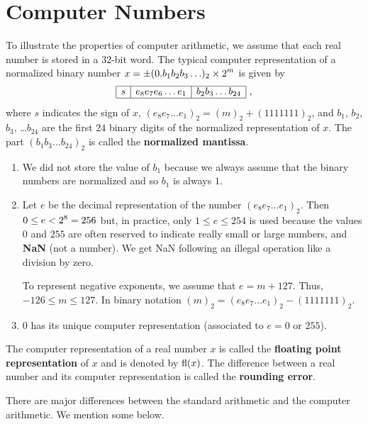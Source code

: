 \section{Computer Numbers}

To illustrate the properties of computer arithmetic, we assume that
each real number is stored in a 32-bit word.  The typical computer
representation of a normalized binary number
$\displaystyle x = \pm(0.b_1 b_2 b_3 \ldots )_2 \times 2^m$ is given by
\[
\begin{array}{|c|c|c|}
\hline
s & e_8 e_7 e_6 \ldots e_1 & b_2 b_3 \ldots b_{24} \\
\hline
\end{array} \ ,
\]
where $s$ indicates the sign of $x$,
$(e_8 e_7 \ldots e_1)_2 = (m)_2 + (1111111)_2$, and
$b_1$, $b_2$, $b_3$, \ldots $b_{24}$ are the
first $24$ binary digits of the normalized representation of $x$.
The part $(b_1 b_3 \ldots b_{24})_2$ is called the
{\bfseries normalized mantissa}.

\begin{rmkList}
\begin{enumerate}
\item We did not store the value of $b_1$ because we always assume
that the binary numbers are normalized and so $b_1$ is always $1$.
\item Let $e$ be the decimal representation of the number
$(e_8 e_7 \ldots e_1)_2$.  Then $\displaystyle 0 \leq e < 2^8 = 256$ but, in
practice, only $1 \leq e \leq 254$ is used because the values $0$ and
$255$ are often reserved to indicate really small or large numbers,
and {\bfseries NaN} (not a number).  We get NaN following an illegal
operation like a division by zero.

To represent negative exponents, we assume that $e = m + 127$.  Thus,
$-126 \leq m \leq 127$.  In binary notation
$(m)_2 = (e_8 e_7 \ldots e_1)_2 - (1111111)_2$.
\item $0$ has its unique computer representation (associated to $e=0$
or $255$).
\end{enumerate}
\end{rmkList}

The computer representation of a real number $x$ is called the
{\bfseries floating point representation} of $x$ and is denoted by
$\operatorname{fl}(x)$.  The difference between a real number and its computer
representation is called the {\bfseries rounding error}.

There are major differences between the standard arithmetic and the
computer arithmetic.  We mention some below.

